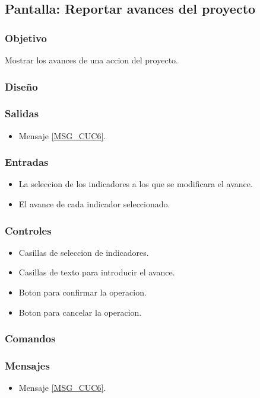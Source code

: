 \subsection{Pantalla: Reportar avances del proyecto}

\subsubsection{Objetivo}
Mostrar los avances de una accion del proyecto.

\subsubsection{Diseño}

\subsubsection{Salidas}
\begin{itemize}
	\item Mensaje \ref{MSG_CUC6}.
\end{itemize}

\subsubsection{Entradas}

\begin{itemize}
	\item La seleccion de los indicadores a los que se modificara el avance.
	\item El avance de cada indicador seleccionado.
\end{itemize}

\subsubsection{Controles}

\begin{itemize}
	\item Casillas de seleccion de indicadores.
	\item Casillas de texto para introducir el avance.
	\item Boton para confirmar la operacion.
	\item Boton para cancelar la operacion.
\end{itemize}

\subsubsection{Comandos}


\subsubsection{Mensajes}
\begin{itemize}
	\item Mensaje \ref{MSG_CUC6}.
\end{itemize}

